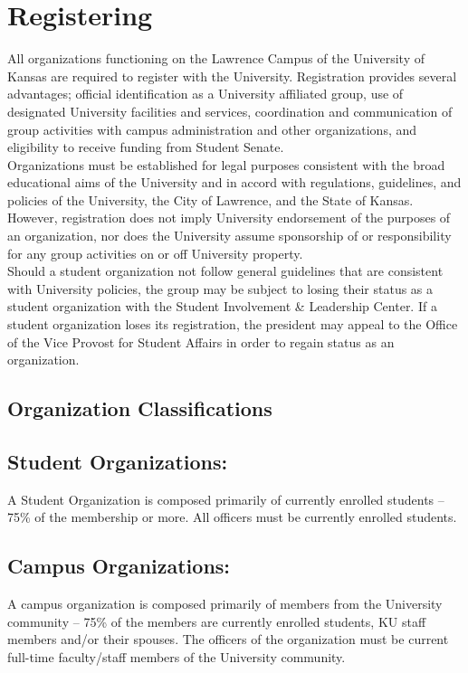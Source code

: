 \section{Registering}
\label{sec:sec02}

All organizations functioning on the Lawrence Campus of the University of Kansas are required to register with the University. Registration provides several advantages; official identification as a University affiliated group, use of designated University facilities and services, coordination and communication of group activities with campus administration and other organizations, and eligibility to receive funding from Student Senate.
\\
Organizations must be established for legal purposes consistent with the broad educational aims of the University and in accord with regulations, guidelines, and policies of the University, the City of Lawrence, and the State of Kansas. However, registration does not imply University endorsement of the purposes of an organization, nor does the University assume sponsorship of or responsibility for any group activities on or off University property.
\\
Should a student organization not follow general guidelines that are consistent with University policies, the group may be subject to losing their status as a student organization with the Student Involvement \& Leadership Center. If a student organization loses its registration, the president may appeal to the Office of the Vice Provost for Student Affairs in order to regain status as an organization.

\subsection{Organization Classifications}

\subsection*{Student Organizations:} A Student Organization is composed primarily of currently enrolled students – 75\% of the membership or more. All officers must be currently enrolled students.
\subsection*{Campus Organizations:} A campus organization is composed primarily of members from the University community – 75\% of the members are currently enrolled students, KU staff members and/or their spouses. The officers of the organization must be current full-time faculty/staff members of the University community.
